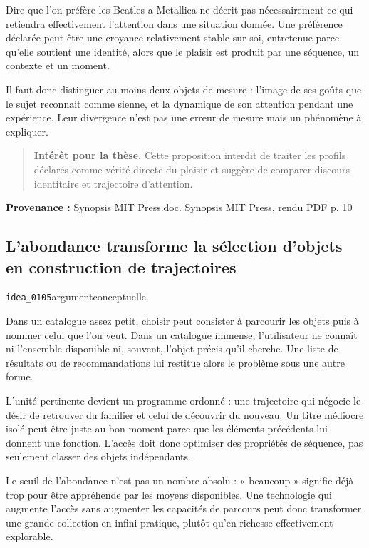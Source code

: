 \documentclass[10pt,a4paper]{article}
\begin{document}
Dire que l'on préfère les Beatles a Metallica ne décrit pas nécessairement ce qui retiendra effectivement l'attention dans une situation donnée. Une préférence déclarée peut être une croyance relativement stable sur soi, entretenue parce qu'elle soutient une identité, alors que le plaisir est produit par une séquence, un contexte et un moment.

Il faut donc distinguer au moins deux objets de mesure : l'image de ses goûts que le sujet reconnait comme sienne, et la dynamique de son attention pendant une expérience. Leur divergence n'est pas une erreur de mesure mais un phénomène à expliquer.

\begin{quote}
\textbf{Intérêt pour la thèse.} Cette proposition interdit de traiter les profils déclarés comme vérité directe du plaisir et suggère de comparer discours identitaire et trajectoire d'attention.
\end{quote}
{\footnotesize\color{metadata}\textbf{Provenance :} Synopsis MIT Press.doc. Synopsis MIT Press, rendu PDF p. 10\par}

\subsection{L'abondance transforme la sélection d'objets en construction de trajectoires}
{\small\color{metadata} \texttt{idea\_0105}\quad\textbullet\quad argument\quad\textbullet\quad conceptuelle\par}

Dans un catalogue assez petit, choisir peut consister à parcourir les objets puis à nommer celui que l'on veut. Dans un catalogue immense, l'utilisateur ne connaît ni l'ensemble disponible ni, souvent, l'objet précis qu'il cherche. Une liste de résultats ou de recommandations lui restitue alors le problème sous une autre forme.

L'unité pertinente devient un programme ordonné : une trajectoire qui négocie le désir de retrouver du familier et celui de découvrir du nouveau. Un titre médiocre isolé peut être juste au bon moment parce que les éléments précédents lui donnent une fonction. L'accès doit donc optimiser des propriétés de séquence, pas seulement classer des objets indépendants.

Le seuil de l'abondance n'est pas un nombre absolu : « beaucoup » signifie déjà trop pour être appréhende par les moyens disponibles. Une technologie qui augmente l'accès sans augmenter les capacités de parcours peut donc transformer une grande collection en infini pratique, plutôt qu'en richesse effectivement explorable.
\end{document}
